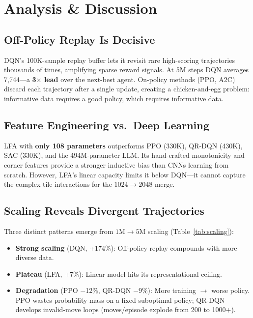 \documentclass[conference, 10pt]{IEEEtran}
\begin{document}

\section{Analysis \& Discussion}
\label{sec:analysis}

\subsection{Off-Policy Replay Is Decisive}

DQN's 100K-sample replay buffer lets it revisit rare high-scoring trajectories thousands of times, amplifying sparse reward signals.  At 5M steps DQN averages 7,744---a \textbf{3$\times$ lead} over the next-best agent.  On-policy methods (PPO, A2C) discard each trajectory after a single update, creating a chicken-and-egg problem: informative data requires a good policy, which requires informative data.

\subsection{Feature Engineering vs.\ Deep Learning}

LFA with \textbf{only 108 parameters} outperforms PPO (330K), QR-DQN (430K), SAC (330K), and the 494M-parameter LLM.  Its hand-crafted monotonicity and corner features provide a stronger inductive bias than CNNs learning from scratch.  However, LFA's linear capacity limits it below DQN---it cannot capture the complex tile interactions for the $1024\!\to\!2048$ merge.

\subsection{Scaling Reveals Divergent Trajectories}

Three distinct patterns emerge from $1\text{M}\!\to\!5\text{M}$ scaling (Table~\ref{tab:scaling}):
\begin{itemize}[nosep,leftmargin=*]
    \item \textbf{Strong scaling} (DQN, +174\%): Off-policy replay compounds with more diverse data.
    \item \textbf{Plateau} (LFA, +7\%): Linear model hits its representational ceiling.
    \item \textbf{Degradation} (PPO $-$12\%, QR-DQN $-$9\%): More training $\to$ worse policy.  PPO wastes probability mass on a fixed suboptimal policy; QR-DQN develops invalid-move loops (moves/episode explode from 200 to 1000+).
\end{itemize}
\end{document}
